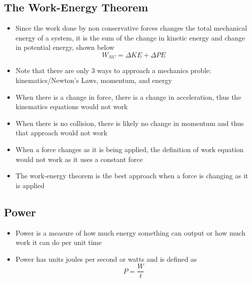 \subsection{The Work-Energy Theorem}
\begin{itemize}
    \item Since the work done by non conservative forces changes the total mechanical energy of a system, it is the sum of the change in kinetic energy and change in potential energy, shown below \[W_{NC}=\Delta KE+\Delta PE\]
    \item Note that there are only 3 ways to approach a mechanics proble: kinematics/Newton's Laws, momentum, and energy
    \item When there is a change in force, there is a change in acceleration, thus the kinematics equations would not work
    \item When there is no collision, there is likely no change in momentum and thus that approach would not work
    \item When a force changes as it is being applied, the definition of work equation would not work as it uses a constant force
    \item The work-energy theorem is the best approach when a force is changing as it is applied
\end{itemize}

\subsection{Power}
\begin{itemize}
    \item Power is a measure of how much energy something can output or how much work it can do per unit time
    \item Power has units joules per second or watts and is defined as \[P=\frac{W}{t}\]
\end{itemize}